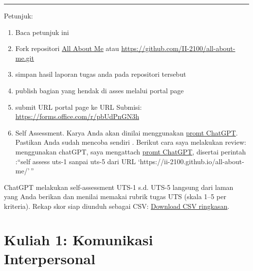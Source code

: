 \documentclass[
  letterpaper,
  DIV=11,
  numbers=noendperiod]{scrreprt}
\begin{document}
\begin{center}\rule{0.5\linewidth}{0.5pt}\end{center}

\begin{tcolorbox}[enhanced jigsaw, breakable, rightrule=.15mm, colbacktitle=quarto-callout-important-color!10!white, opacityback=0, titlerule=0mm, leftrule=.75mm, bottomrule=.15mm, toptitle=1mm, colframe=quarto-callout-important-color-frame, bottomtitle=1mm, arc=.35mm, coltitle=black, opacitybacktitle=0.6, toprule=.15mm, left=2mm, title=\textcolor{quarto-callout-important-color}{\faExclamation}\hspace{0.5em}{Important}, colback=white]

Petunjuk:

\begin{enumerate}
\def\labelenumi{\arabic{enumi}.}
\item
  Baca petunjuk ini
\item
  Fork repositori \href{https://github.com/II-2100/all-about-me.git}{All
  About Me} atau \url{https://github.com/II-2100/all-about-me.git}
\item
  simpan hasil laporan tugas anda pada repositori tersebut
\item
  publish bagian yang hendak di asses melalui portal page
\item
  submit URL portal page ke URL Submisi:
  \url{https://forms.office.com/r/pbUdPnGN3h}
\item
  Self Assessment. Karya Anda akan dinilai menggunakan
  \href{asesmen/skor_uts.pdf}{promt ChatGPT}. Pastikan Anda sudah
  mencoba sendiri . Berikut cara saya melakukan review: menggunakan
  chatGPT, saya mengattach \href{asesmen/skor_uts.pdf}{promt ChatGPT},
  disertai perintah :``self assess uts-1 sanpai uts-5 dari URL
  `https://ii-2100.github.io/all-about-me/'\,''
\end{enumerate}

ChatGPT melakukan self-assessment UTS-1 s.d. UTS-5 langsung dari laman
yang Anda berikan dan menilai memakai rubrik tugas UTS (skala 1--5 per
kriteria). Rekap skor siap diunduh sebagai CSV:
\href{sandbox:/mnt/data/UTS_self_assessment.csv}{Download CSV
ringkasan}.

\end{tcolorbox}


\chapter{Kuliah 1: Komunikasi
Interpersonal}\label{kuliah-1-komunikasi-interpersonal}
\end{document}
